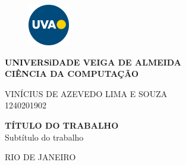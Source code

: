 \begin{titlepage}
    
    \centering
    
    \begin{figure}[h]
        \centering
        \includegraphics[width=1.8cm]{Figuras/uva.png}
    \end{figure}
        
    \textbf{UNIVERSiDADE VEIGA DE ALMEIDA} \\
    \textbf{CIÊNCIA DA COMPUTAÇÃO} \\
    \vspace{5 em}

    VINÍCIUS DE AZEVEDO LIMA E SOUZA \\
    1240201902 
    
    \vfill

    \textbf{TÍTULO DO TRABALHO} \\ 
    Subtítulo do trabalho
    
        
    \vfill 
        
    RIO DE JANEIRO \\
    \the \year

\end{titlepage}
